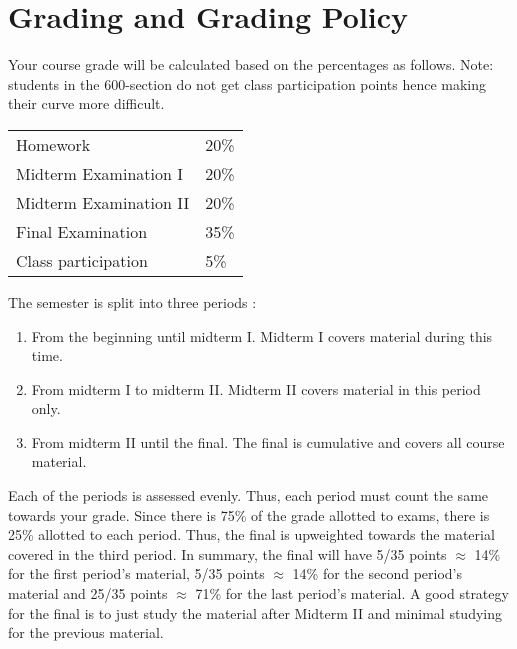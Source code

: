 \section*{Grading and Grading Policy}\label{sec:grading}

Your course grade will be calculated based on the percentages as follows. Note: students in the 600-section do not get class participation points hence making their curve more difficult.

\begin{table}[h]
\centering
\begin{tabular}{l|l}
Homework & 20\% \\
Midterm Examination I & 20\%\\
Midterm Examination II & 20\%\\
Final Examination & 35\% \\
Class participation & 5\%
\end{tabular}
\end{table}
\FloatBarrier



The semester is split into three periods :

\begin{enumerate}
\item From the beginning until midterm I. Midterm I covers material during this time.
\item From midterm I to midterm II. Midterm II covers material in this period only. 
\item From midterm II until the final. The final is cumulative and covers all course material.
\end{enumerate}

Each of the periods is assessed evenly. Thus, each period must count the same towards your grade. Since there is 75\% of the grade allotted to exams, there is 25\% allotted to each period. Thus, the final is upweighted towards the material covered in the third period. In summary, the final will have 5/35 points $\approx$ 14\% for the first period's material, 5/35 points $\approx$ 14\% for the second period's material and 25/35 points $\approx$ 71\% for the last period's material. A good strategy for the final is to just study the material after Midterm II and minimal studying for the previous material.